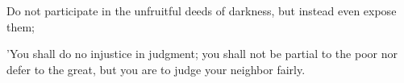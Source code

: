 \vspace{2\baselineskip}

\begin{scripture}[Ephesians 5:11]
    Do not participate in the unfruitful deeds of darkness, but instead even expose them;
\end{scripture}

\vspace{2\baselineskip}

\begin{scripture}[Leviticus 19:15]
    'You shall do no injustice in judgment; you shall not be partial to the poor nor defer to the great, but you are to judge your neighbor fairly.
\end{scripture}
